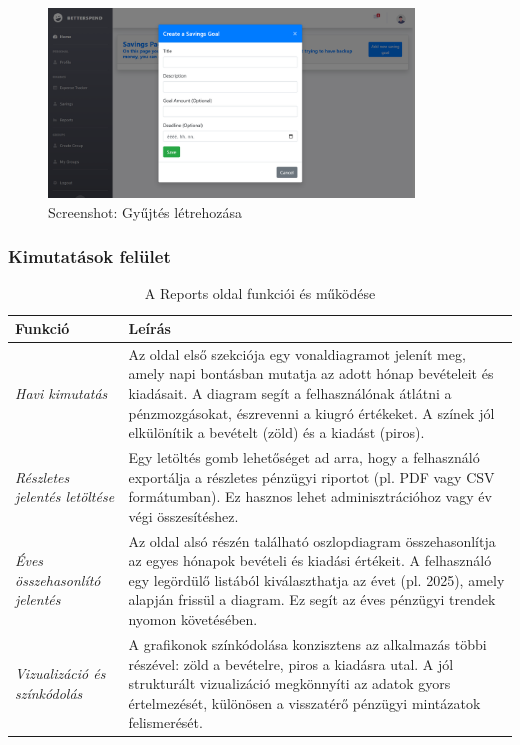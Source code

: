\begin{figure}[H]
	\centering
	\includegraphics[height=190px]{img/add-saving}
	\caption{Screenshot: Gyűjtés létrehozása}
	\label{fig:addsaving}
\end{figure}

\subsubsection{Kimutatások felület}
\begin{table}[H]
	\centering
	\begin{tabular}{ | m{} | m{} | }
		\hline
		\textbf{Funkció} & \textbf{Leírás} \\
		\hline \hline
		
		\emph{Havi kimutatás} &
		Az oldal első szekciója egy vonaldiagramot jelenít meg, amely napi bontásban mutatja az adott hónap bevételeit és kiadásait. A diagram segít a felhasználónak átlátni a pénzmozgásokat, észrevenni a kiugró értékeket. A színek jól elkülönítik a bevételt (zöld) és a kiadást (piros). \\
		
		\hline
		
		\emph{Részletes jelentés letöltése} &
		Egy letöltés gomb lehetőséget ad arra, hogy a felhasználó exportálja a részletes pénzügyi riportot (pl. PDF vagy CSV formátumban). Ez hasznos lehet adminisztrációhoz vagy év végi összesítéshez. \\
		
		\hline
		
		\emph{Éves összehasonlító jelentés} &
		Az oldal alsó részén található oszlopdiagram összehasonlítja az egyes hónapok bevételi és kiadási értékeit. A felhasználó egy legördülő listából kiválaszthatja az évet (pl. 2025), amely alapján frissül a diagram. Ez segít az éves pénzügyi trendek nyomon követésében. \\
		
		\hline
		
		\emph{Vizualizáció és színkódolás} &
		A grafikonok színkódolása konzisztens az alkalmazás többi részével: zöld a bevételre, piros a kiadásra utal. A jól strukturált vizualizáció megkönnyíti az adatok gyors értelmezését, különösen a visszatérő pénzügyi mintázatok felismerését. \\
		
		\hline
	\end{tabular}
	\caption{A Reports oldal funkciói és működése}
	\label{tab:reports}
\end{table}

